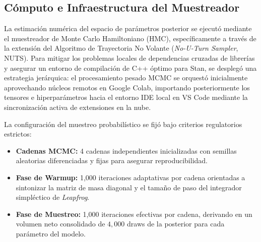 \documentclass[11pt,a4paper]{article}
\begin{document}
\subsection{Cómputo e Infraestructura del Muestreador}
La estimación numérica del espacio de parámetros posterior se ejecutó mediante el muestreador de Monte Carlo Hamiltoniano (HMC), específicamente a través de la extensión del Algoritmo de Trayectoria No Volante (\textit{No-U-Turn Sampler}, NUTS). Para mitigar los problemas locales de dependencias cruzadas de librerías y asegurar un entorno de compilación de C++ óptimo para Stan, se desplegó una estrategia jerárquica: el procesamiento pesado MCMC se orquestó inicialmente aprovechando núcleos remotos en Google Colab, importando posteriormente los tensores e hiperparámetros hacia el entorno IDE local en VS Code mediante la sincronización activa de extensiones en la nube.

La configuración del muestreo probabilístico se fijó bajo criterios regulatorios estrictos:
\begin{itemize}
    \item \textbf{Cadenas MCMC:} 4 cadenas independientes inicializadas con semillas aleatorias diferenciadas y fijas para asegurar reproducibilidad.
    \item \textbf{Fase de Warmup:} 1,000 iteraciones adaptativas por cadena orientadas a sintonizar la matriz de masa diagonal y el tamaño de paso del integrador simpléctico de \textit{Leapfrog}.
    \item \textbf{Fase de Muestreo:} 1,000 iteraciones efectivas por cadena, derivando en un volumen neto consolidado de $4,000$ draws de la posterior para cada parámetro del modelo.
\end{itemize}

\end{document}
